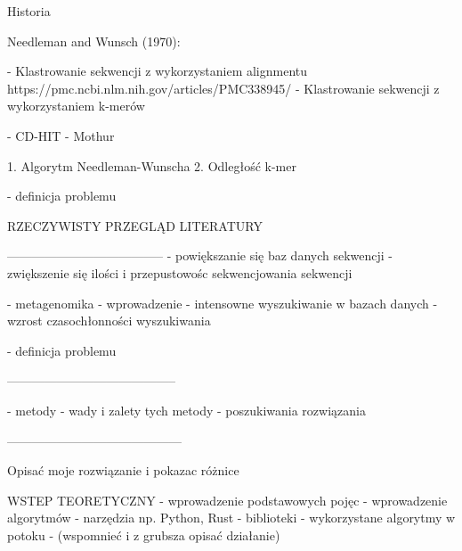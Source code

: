 Historia

    Needleman and Wunsch (1970):



- Klastrowanie sekwencji z wykorzystaniem alignmentu
    https://pmc.ncbi.nlm.nih.gov/articles/PMC338945/
- Klastrowanie sekwencji z wykorzystaniem k-merów


- CD-HIT
- Mothur



1. Algorytm Needleman-Wunscha
2. Odległość k-mer



- definicja problemu


RZECZYWISTY PRZEGLĄD LITERATURY

--------------------------------------
- powiększanie się baz danych sekwencji
- zwiększenie się ilości i przepustowośc sekwencjowania sekwencji


- metagenomika - wprowadzenie
    - intensowne wyszukiwanie w bazach danych
    - wzrost czasochłonności wyszukiwania

- definicja problemu

-----------------------------------------

- metody
- wady i zalety tych metody
- poszukiwania rozwiązania

------------------------------------------

Opisać moje rozwiązanie i pokazac różnice


WSTEP TEORETYCZNY
    - wprowadzenie podstawowych pojęc
    - wprowadzenie algorytmów
    - narzędzia np. Python, Rust
        - biblioteki
    - wykorzystane algorytmy w potoku - (wspomnieć i z grubsza opisać działanie)











